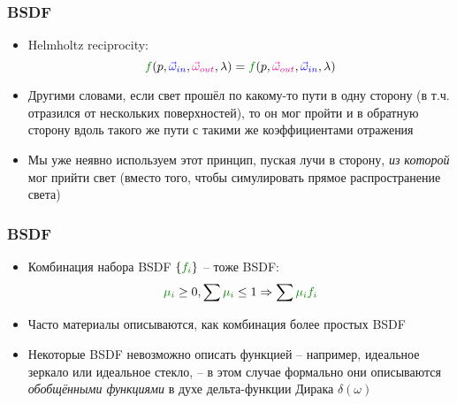 \documentclass[handout,10pt]{beamer}
\begin{document}
\begin{frame}[fragile]
\frametitle{BSDF}
\begin{itemize}
\item Helmholtz reciprocity:
\begin{equation*}
{\color{green}f}(p, {\color{blue}\vec\omega_{in}}, {\color{magenta}\vec\omega_{out}}, \lambda) = {\color{green}f}(p, {\color{magenta}\vec\omega_{out}}, {\color{blue}\vec\omega_{in}}, \lambda)
\end{equation*}
\pause
\item Другими словами, если свет прошёл по какому-то пути в одну сторону (в т.ч. отразился от нескольких поверхностей), то он мог пройти и в обратную сторону вдоль такого же пути с такими же коэффициентами отражения
\pause
\item Мы уже неявно используем этот принцип, пуская лучи в сторону, \textit{из которой} мог прийти свет (вместо того, чтобы симулировать прямое распространение света)
\end{itemize}
\end{frame}

\begin{frame}[fragile]
\frametitle{BSDF}
\begin{itemize}
\item Комбинация набора BSDF \begin{math}\{{\color{green}f_i}\}\end{math} -- тоже BSDF:
\begin{equation*}
{\color{green}\mu_i} \geq 0, \sum {\color{green}\mu_i} \leq 1 \Rightarrow \sum {\color{green}\mu_i f_i}
\end{equation*}
\pause
\item Часто материалы описываются, как комбинация более простых BSDF
\pause
\item Некоторые BSDF невозможно описать функцией -- например, идеальное зеркало или идеальное стекло, -- в этом случае формально они описываются \textit{обобщёнными функциями} в духе дельта-функции Дирака \begin{math}\delta(\omega)\end{math}
\end{itemize}
\end{frame}
\end{document}
